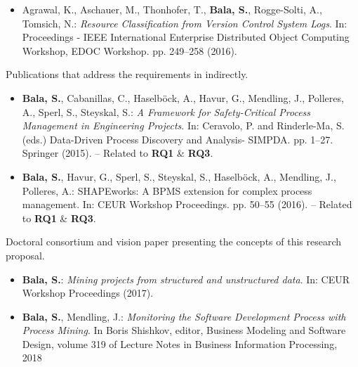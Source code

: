 \documentclass[a4paper,11pt]{article}
\begin{document}

\begin{itemize}
	\item Agrawal, K., Aschauer, M., Thonhofer, T., \textbf{Bala, S.}, Rogge-Solti, A., Tomsich, N.: \textit{Resource Classification from Version Control System Logs}. In: Proceedings - IEEE International Enterprise Distributed Object Computing Workshop, EDOC Workshop. pp. 249--258 (2016). \cite{Agrawal2016}
\end{itemize}


\noindent Publications that address the requirements in  indirectly.


\begin{itemize}
	
	\item \textbf{Bala, S.}, Cabanillas, C., Haselböck, A., Havur, G., Mendling, J., Polleres, A., Sperl, S., Steyskal, S.: \textit{A Framework for Safety-Critical Process Management in Engineering Projects}. In: Ceravolo, P. and Rinderle-Ma, S. (eds.) Data-Driven Process Discovery and Analysis- SIMPDA. pp. 1--27. Springer (2015). \cite{Bala2017c} -- Related to \textbf{RQ1} \& \textbf{RQ3}.
	
	\item \textbf{Bala, S.}, Havur, G., Sperl, S., Steyskal, S., Haselböck, A., Mendling, J., Polleres, A.: SHAPEworks: A BPMS extension for complex process management. In: CEUR Workshop Proceedings. pp. 50--55 (2016). \cite{Bala2016} -- Related to \textbf{RQ1} \& \textbf{RQ3}.
	
\end{itemize}

\noindent Doctoral consortium and vision paper presenting the concepts of this research proposal.

\begin{itemize}
	\item \textbf{Bala, S.}: \textit{Mining projects from structured and unstructured data}. In: CEUR Workshop Proceedings (2017). \cite{Bala2017b}

	\item \textbf{Bala, S.}, Mendling, J.: \textit{Monitoring the Software Development Process
		with Process Mining}. In Boris Shishkov, editor, Business Modeling and Software
	Design, volume 319 of Lecture Notes in Business Information Processing, 2018 \cite{Bala2018} 
	
\end{itemize}
\end{document}
